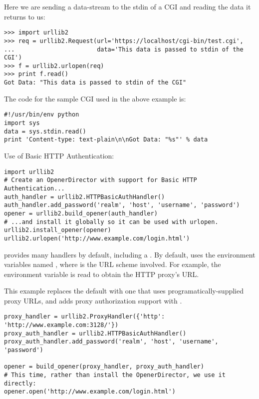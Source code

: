 Here we are sending a data-stream to the stdin of a CGI and reading
the data it returns to us:

\begin{verbatim}
>>> import urllib2
>>> req = urllib2.Request(url='https://localhost/cgi-bin/test.cgi',
...                       data='This data is passed to stdin of the CGI')
>>> f = urllib2.urlopen(req)
>>> print f.read()
Got Data: "This data is passed to stdin of the CGI"
\end{verbatim}

The code for the sample CGI used in the above example is:

\begin{verbatim}
#!/usr/bin/env python
import sys
data = sys.stdin.read()
print 'Content-type: text-plain\n\nGot Data: "%s"' % data
\end{verbatim}


Use of Basic HTTP Authentication:

\begin{verbatim}
import urllib2
# Create an OpenerDirector with support for Basic HTTP Authentication...
auth_handler = urllib2.HTTPBasicAuthHandler()
auth_handler.add_password('realm', 'host', 'username', 'password')
opener = urllib2.build_opener(auth_handler)
# ...and install it globally so it can be used with urlopen.
urllib2.install_opener(opener)
urllib2.urlopen('http://www.example.com/login.html')
\end{verbatim}

 provides many handlers by default, including a
.  By default,  uses the
environment variables named , where 
is the URL scheme involved.  For example, the 
environment variable is read to obtain the HTTP proxy's URL.

This example replaces the default  with one that uses
programatically-supplied proxy URLs, and adds proxy authorization support
with .

\begin{verbatim}
proxy_handler = urllib2.ProxyHandler({'http': 'http://www.example.com:3128/'})
proxy_auth_handler = urllib2.HTTPBasicAuthHandler()
proxy_auth_handler.add_password('realm', 'host', 'username', 'password')

opener = build_opener(proxy_handler, proxy_auth_handler)
# This time, rather than install the OpenerDirector, we use it directly:
opener.open('http://www.example.com/login.html')
\end{verbatim}


